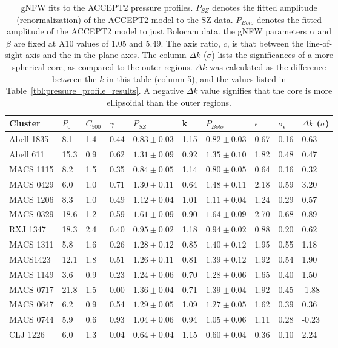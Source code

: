 \documentclass{article}
\begin{document}
\begin{table}
  \centering
  \begin{tabular}{l | l l l | l l l | l l l}
    Cluster & $P_0$ & $C_{500}$ & $\gamma$ & $P_{SZ}$ & k & $P_{Bolo}$ & $\epsilon$ & $\sigma_{\epsilon}$ & $\Delta k$ ($\sigma$) \\
    \hline   
  Abell 1835 &  8.1 &  1.4 & 0.44 & $0.83\pm0.03$ & 1.15 & $0.82\pm0.03$ & 0.67 & 0.16 &  0.63 \\
   Abell 611 & 15.3 &  0.9 & 0.62 & $1.31\pm0.09$ & 0.92 & $1.35\pm0.10$ & 1.82 & 0.48 &  0.47 \\
   MACS 1115 &  8.2 &  1.5 & 0.35 & $0.84\pm0.05$ & 1.14 & $0.80\pm0.05$ & 0.64 & 0.16 &  0.32 \\
   MACS 0429 &  6.0 &  1.0 & 0.71 & $1.30\pm0.11$ & 0.64 & $1.48\pm0.11$ & 2.18 & 0.59 &  3.20 \\
   MACS 1206 &  8.3 &  1.0 & 0.49 & $1.12\pm0.04$ & 1.01 & $1.11\pm0.04$ & 1.24 & 0.29 &  0.57 \\
   MACS 0329 & 18.6 &  1.2 & 0.59 & $1.61\pm0.09$ & 0.90 & $1.64\pm0.09$ & 2.70 & 0.68 &  0.89 \\
    RXJ 1347 & 18.3 &  2.4 & 0.40 & $0.95\pm0.02$ & 1.18 & $0.94\pm0.02$ & 0.88 & 0.20 &  0.62 \\
   MACS 1311 &  5.8 &  1.6 & 0.26 & $1.28\pm0.12$ & 0.85 & $1.40\pm0.12$ & 1.95 & 0.55 &  1.18 \\
    MACS1423 & 12.1 &  1.8 & 0.51 & $1.26\pm0.11$ & 0.81 & $1.39\pm0.12$ & 1.92 & 0.54 &  1.90 \\
   MACS 1149 &  3.6 &  0.9 & 0.23 & $1.24\pm0.06$ & 0.70 & $1.28\pm0.06$ & 1.65 & 0.40 &  1.50 \\
   MACS 0717 & 21.8 &  1.5 & 0.00 & $1.36\pm0.04$ & 0.71 & $1.39\pm0.04$ & 1.92 & 0.45 & -1.88 \\
   MACS 0647 &  6.2 &  0.9 & 0.54 & $1.29\pm0.05$ & 1.09 & $1.27\pm0.05$ & 1.62 & 0.39 &  0.36 \\
   MACS 0744 &  5.9 &  0.6 & 0.93 & $1.04\pm0.06$ & 0.94 & $1.05\pm0.06$ & 1.11 & 0.28 & -0.23 \\
    CLJ 1226 &  6.0 &  1.3 & 0.04 & $0.64\pm0.04$ & 1.15 & $0.60\pm0.04$ & 0.36 & 0.10 &  2.24 
  \end{tabular}
  \caption{gNFW fits to the ACCEPT2 pressure profiles. $P_{SZ}$ denotes the fitted
    amplitude (renormalization) of the ACCEPT2 model to the SZ data. $P_{Bolo}$ denotes the
    fitted amplitude of the ACCEPT2 model to just Bolocam data. the gNFW parameters $\alpha$ and
    $\beta$ are fixed at A10 values of 1.05 and 5.49.  The axis ratio,  $c$, is that between the line-of-sight
    axis and the in-the-plane axes. The column $\Delta k$ ($\sigma$) lists the 
    significances of a more spherical core, as compared to the outer regions. $\Delta k$ was calculated
    as the difference between the $k$ in this table (column 5), and the values listed in
    Table~\ref{tbl:pressure_profile_results}. A negative $\Delta k$ value
    signifies that the core is more ellipsoidal than the outer regions.}
  \label{tbl:a2_res}
\end{table}
\end{document}
